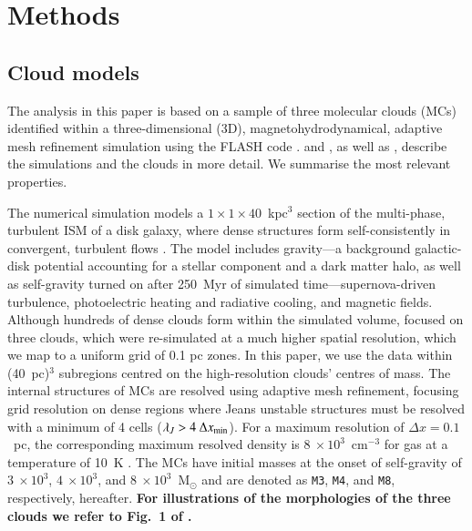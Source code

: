 \section{Methods}\label{methods}


\subsection{Cloud models}\label{methods:clouds}

The analysis in this paper is based on a sample of three molecular clouds (MCs) identified within a three-dimensional (3D), magnetohydrodynamical, adaptive mesh refinement simulation using the FLASH code \citep{Fryxell2000}.  
 and , as well as \citet[ hereafter]{Chira2018}, describe the simulations and the clouds in more detail. 
We summarise the most relevant properties. 

The numerical simulation models a $1\times1\times40$~kpc$^3$ section of the multi-phase, turbulent ISM of a disk galaxy, where dense structures form self-consistently in convergent, turbulent flows .  
The model includes gravity---a background galactic-disk potential accounting for a stellar component and a dark matter halo, as well as self-gravity turned on after 250~Myr of simulated time---supernova-driven turbulence, photoelectric heating and radiative cooling, and magnetic fields. 
Although hundreds of dense clouds form within the simulated volume,  focused on three clouds, which were re-simulated at a much higher spatial resolution, which we map to a uniform grid of 0.1 pc zones.
In this paper, we use the data within (40~pc)$^{3}$ subregions centred on the high-resolution clouds' centres of mass.
The internal structures of MCs are resolved using adaptive mesh refinement, focusing grid resolution on dense regions where Jeans unstable structures must be resolved with a minimum of 4 cells ($\lambda_J > 4~\Delta x_{\rm min}$).
For a maximum resolution of $\Delta x = 0.1$~pc, the corresponding maximum resolved density is $8~\times 10^3$~cm$^{-3}$ for gas at a temperature of 10~K .
The MCs have initial masses at the onset of self-gravity of $3~\times 10^3$, $4~\times 10^3$, and $8~\times 10^3$~M$_{\odot}$ and are denoted as \texttt{M3}, \texttt{M4}, and \texttt{M8}, respectively, hereafter.
\textbf{
    For illustrations of the morphologies of the three clouds we refer to Fig.~1 of .
}

